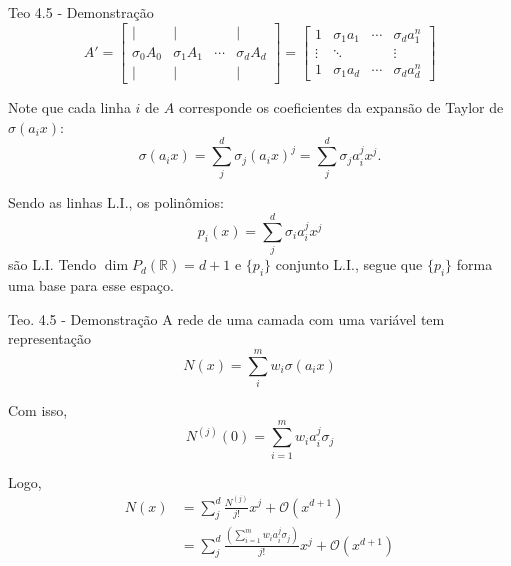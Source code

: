 \documentclass{beamer}
\theoremstyle{definition}
\begin{document}
\begin{frame}{Teo 4.5 - Demonstração}
    \small
    \begin{equation}
        A' = \begin{bmatrix}
            |  & | & & | \\
            \sigma_0 A_0 & \sigma_1 A_1 & \cdots & \sigma_d A_d \\
            |  & | & & | 
        \end{bmatrix} = 
        \begin{bmatrix}
            1 & \sigma_1 a_1 & \cdots & \sigma_d a_1^n \\
            \vdots & \ddots & &  \vdots \\
            1 & \sigma_1 a_d & \cdots & \sigma_d a_d^n 
        \end{bmatrix}
    \end{equation}

    Note que cada linha $i$ de $A$ corresponde os coeficientes da expansão de Taylor de $\sigma(a_i x)$:
    \begin{equation*}
        \sigma(a_i x) = \sum_j^d \sigma_j (a_i x)^j = \sum_j^d \sigma_j a_i^j x^j.
    \end{equation*}

    \pause

    Sendo as linhas L.I., os polinômios:
    \begin{equation*}
        p_i(x) = \sum_j^d \sigma_i a_i^j x^j
    \end{equation*}
    são L.I. \pause Tendo $\dim P_d(\mathbb R) = d+1$ e $\{p_i\}$ conjunto L.I., segue que $\{p_i\}$ forma uma base para esse espaço.  

\end{frame}

\begin{frame}{Teo. 4.5 - Demonstração}
    A rede de uma camada com uma variável tem representação 
    \begin{equation*}
        N(x) = \sum_i^m w_i \sigma(a_i x)
    \end{equation*}

    \pause 
    
    Com isso,
    \begin{equation*}
        N^{(j)}(0) = \sum_{i=1}^m w_i a_i^j \sigma_j
    \end{equation*}
    
    \pause

    Logo,
    \begin{align*}
        N(x) &= \sum_j^d \frac{N^{(j)}}{j!} x^j + \mathcal O(x^{d+1}) \\
        &= \sum_j^d \frac{(\sum_{i=1}^m w_i a_i^j \sigma_j)}{j!} x^j + \mathcal O(x^{d+1})
    \end{align*}
\end{frame}
\end{document}
